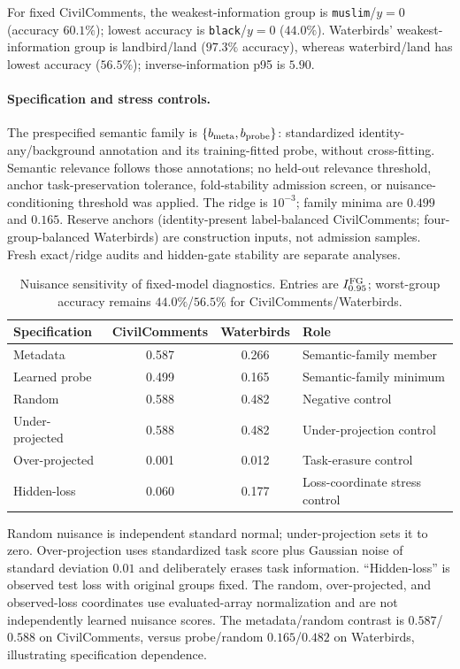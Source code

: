 For fixed CivilComments, the weakest-information group is \texttt{muslim}/$y=0$ (accuracy $60.1\%$); lowest accuracy is \texttt{black}/$y=0$ ($44.0\%$). Waterbirds' weakest-information group is landbird/land ($97.3\%$ accuracy), whereas waterbird/land has lowest accuracy ($56.5\%$); inverse-information p95 is $5.90$.

\paragraph{Specification and stress controls.}
The prespecified semantic family is $\{b_{\rm meta},b_{\rm probe}\}$: standardized identity-any/background annotation and its training-fitted probe, without cross-fitting. Semantic relevance follows those annotations; no held-out relevance threshold, anchor task-preservation tolerance, fold-stability admission screen, or nuisance-conditioning threshold was applied. The ridge is $10^{-3}$; family minima are $0.499$ and $0.165$. Reserve anchors (identity-present label-balanced CivilComments; four-group-balanced Waterbirds) are construction inputs, not admission samples. Fresh exact/ridge audits and hidden-gate stability are separate analyses.

\begin{table}[htbp]
\centering\small
\setlength{\tabcolsep}{3pt}
\caption{Nuisance sensitivity of fixed-model diagnostics. Entries are $I_{0.95}^{\mathrm{FG}}$; worst-group accuracy remains $44.0\%$/$56.5\%$ for CivilComments/Waterbirds.}
\label{tab:d-nuisance-sensitivity}
\begin{tabular}{@{}lccp{.27\linewidth}@{}}
\toprule
Specification & CivilComments & Waterbirds & Role \\
\midrule
Metadata & 0.587 & 0.266 & Semantic-family member \\
Learned probe & 0.499 & 0.165 & Semantic-family minimum \\
Random & 0.588 & 0.482 & Negative control \\
Under-projected & 0.588 & 0.482 & Under-projection control \\
Over-projected & 0.001 & 0.012 & Task-erasure control \\
Hidden-loss & 0.060 & 0.177 & Loss-coordinate stress control \\
\bottomrule
\end{tabular}
\par\smallskip
\end{table}


Random nuisance is independent standard normal; under-projection sets it to zero. Over-projection uses standardized task score plus Gaussian noise of standard deviation $0.01$ and deliberately erases task information. ``Hidden-loss'' is observed test loss with original groups fixed. The random, over-projected, and observed-loss coordinates use evaluated-array normalization and are not independently learned nuisance scores. The metadata/random contrast is $0.587$/$0.588$ on CivilComments, versus probe/random $0.165$/$0.482$ on Waterbirds, illustrating specification dependence.

